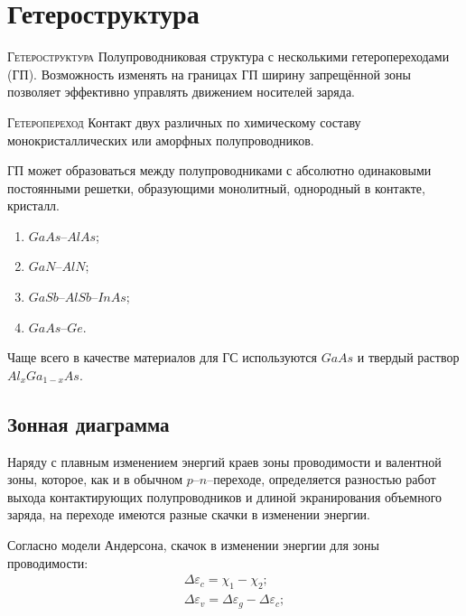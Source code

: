 \section{Гетероструктура}
\begin{definition}{\textsc{Гетероструктура}}
	Полупроводниковая структура с несколькими гетеропереходами (ГП). Возможность изменять на границах ГП ширину запрещённой зоны позволяет эффективно управлять движением носителей заряда.
\end{definition}

\begin{definition}{\textsc{Гетеропереход}}
	Контакт двух различных по химическому составу монокристаллических или аморфных полупроводников.
\end{definition}

ГП может образоваться между полупроводниками с абсолютно одинаковыми постоянными решетки, образующими монолитный, однородный в контакте, кристалл.
\begin{enumerate}
	\item $GaAs$--$AlAs$;
	\item $GaN$--$AlN$;
	\item $GaSb$--$AlSb$--$InAs$;
	\item $GaAs$--$Ge$.
\end{enumerate}
Чаще всего в качестве материалов для ГС используются $GaAs$ и твердый раствор $Al_{x}Ga_{1−x}As$.

\subsection{Зонная диаграмма}
Наряду с плавным изменением энергий краев зоны проводимости и валентной зоны, которое, как и в обычном $p$--$n$--переходе, определяется разностью работ выхода контактирующих полупроводников и длиной экранирования объемного заряда, на переходе имеются разные скачки в изменении энергии.

Согласно модели Андерсона, скачок в изменении энергии для зоны проводимости:
\begin{gather}
	\Delta \varepsilon_{c} = \chi_{1} - \chi_{2};\\
	\Delta \varepsilon_{v} = \Delta \varepsilon_{g} - \Delta \varepsilon_{c};
\end{gather}

